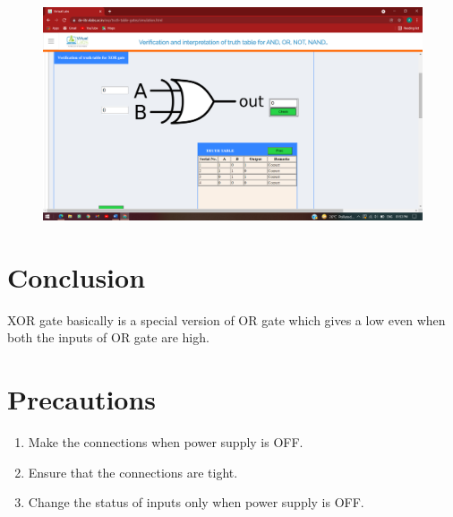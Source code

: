 		\begin{figure}[h]
		\centering
		\includegraphics[width=0.9\linewidth]{img/exp6/7}
		\caption{}
		\label{fig:6:7}
	\end{figure}

\section{Conclusion}
XOR gate basically is a special version of OR gate which gives a low even when both the inputs of OR gate are high.

\section{Precautions}
	\begin{enumerate}
		\tightlist
		\item Make the connections when power supply is OFF.
		\item Ensure that the connections are tight.
		\item Change the status of inputs only when power supply is OFF.
	\end{enumerate}